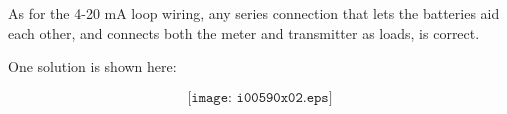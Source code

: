 \vskip 10pt

As for the 4-20 mA loop wiring, any series connection that lets the batteries aid each other, and connects both the meter and transmitter as loads, is correct.

\vskip 10pt

One solution is shown here:

$$\texttt{[image: i00590x02.eps]}$$



